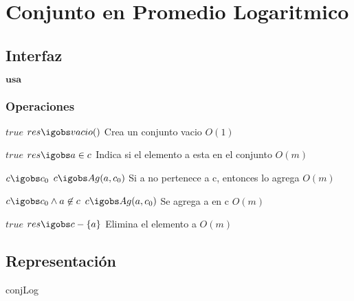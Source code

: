
\section{Conjunto en Promedio Logaritmico}

\subsection{Interfaz}

$\textbf{usa}$


\subsubsection*{Operaciones}


 {$true$}
 {$res \igobs vacio()$}
 {Crea un conjunto vacio}
 {$O(1)$}
 {}
 
  {$true$}
  {$res \igobs a \in c$}
  {Indica si el elemento a esta en el conjunto}
  {$O(m)$}
  {}

  {$c \igobs c_0$}
  {$c \igobs Ag(a, c_0)$}
  {Si a no pertenece a c, entonces lo agrega}
  {$O(m)$}
  {}

  {$c \igobs c_0 \land a \not\in c$}
  {$c \igobs Ag(a, c_0)$}
  {Se agrega a en c}
  {$O(m)$}
  {}
  
  
 {$true$}
 {$res \igobs c-\{a\}$}
 {Elimina el elemento a}
 {$O(m)$}
 {}


\subsection{Representación}

conjLog

